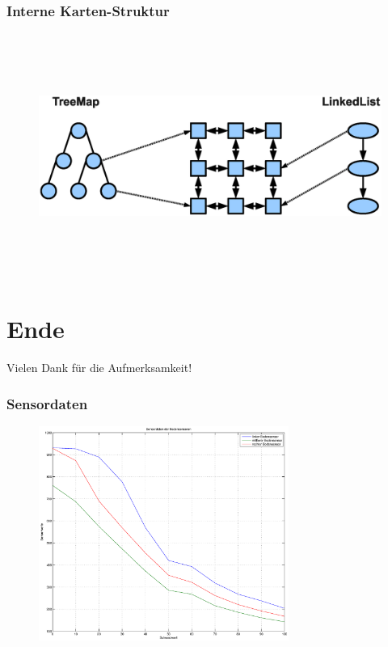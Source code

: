 \documentclass[xcolor=dvipsnames]{beamer}
\begin{document}
		\begin{frame}
			\frametitle{Interne Karten-Struktur}
				\begin{figure}[htbp]
					\centering
						\includegraphics[height=8cm]{images/map.eps}
  				\end{figure}					
		\end{frame}
\section{Ende}
	\begin{frame}
		\begin{center}
			Vielen Dank für die Aufmerksamkeit!
		\end{center}
	\end{frame}
	\begin{frame}
		\frametitle{Sensordaten}
		\begin{figure}[htbp]
			\centering
			\includegraphics[height=7cm]{images/sensorgrafik.eps}
  		\end{figure}	
	\end{frame}	
		
\end{document}
